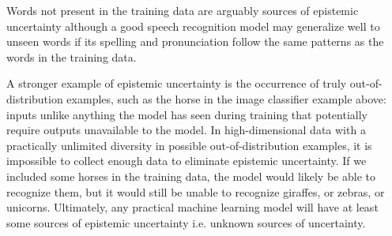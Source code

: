 Words not present in the training data are arguably sources of epistemic uncertainty although a good speech recognition model may generalize well to unseen words if its spelling and pronunciation follow the same patterns as the words in the training data. 

A stronger example of epistemic uncertainty is the occurrence of truly out-of-distribution examples, such as the horse in the image classifier example above: inputs unlike anything the model has seen during training that potentially require outputs unavailable to the model. 
In high-dimensional data with a practically unlimited diversity in possible out-of-distribution examples, it is impossible to collect enough data to eliminate epistemic uncertainty. If we included some horses in the training data, the model would likely be able to recognize them, but it would still be unable to recognize giraffes, or zebras, or unicorns. 
Ultimately, any practical machine learning model will have at least some sources of epistemic uncertainty i.e. unknown sources of uncertainty. 




